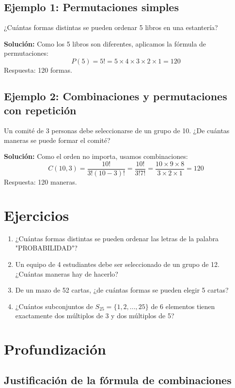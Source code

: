 \documentclass{article}
\begin{document}
\subsection{Ejemplo 1: Permutaciones simples}
¿Cuántas formas distintas se pueden ordenar 5 libros en una estantería?

\textbf{Solución:} Como los 5 libros son diferentes, aplicamos la fórmula de permutaciones:
\begin{equation}
    P(5) = 5! = 5 \times 4 \times 3 \times 2 \times 1 = 120
\end{equation}
Respuesta: 120 formas.

\subsection{Ejemplo 2: Combinaciones y permutaciones con repetición}
Un comité de 3 personas debe seleccionarse de un grupo de 10. ¿De cuántas maneras se puede formar el comité?

\textbf{Solución:} Como el orden no importa, usamos combinaciones:
\begin{equation}
    C(10, 3) = \frac{10!}{3!(10-3)!} = \frac{10!}{3!7!} = \frac{10 \times 9 \times 8}{3 \times 2 \times 1} = 120
\end{equation}
Respuesta: 120 maneras.

\section{Ejercicios}

\begin{enumerate}
    \item ¿Cuántas formas distintas se pueden ordenar las letras de la palabra "PROBABILIDAD"?
    \item Un equipo de 4 estudiantes debe ser seleccionado de un grupo de 12. ¿Cuántas maneras hay de hacerlo?
    \item De un mazo de 52 cartas, ¿de cuántas formas se pueden elegir 5 cartas?
    \item ¿Cuántos subconjuntos de $S_{25} = \{1, 2,..., 25\}$ de 6 elementos tienen exactamente dos múltiplos de 3 y dos múltiplos de 5?
\end{enumerate}

\section{Profundización}
\subsection{Justificación de la fórmula de combinaciones}
\end{document}
